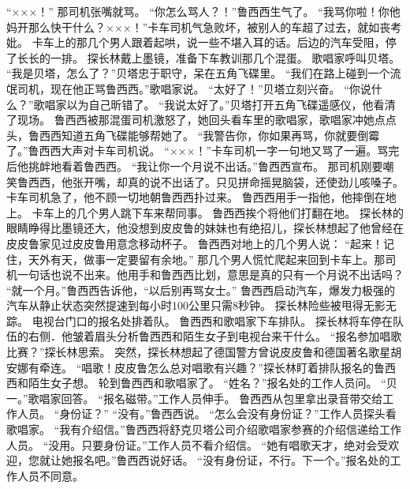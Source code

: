 \documentclass[a4paper,12pt,UTF8,twoside]{ctexbook}
\begin{document}
        “×××！”  
        那司机张嘴就骂。  
        “你怎么骂人？！”鲁西西生气了。  
        “我骂你啦！你他妈开那么快干什么？×××！”卡车司机气急败坏，被别人的车超了过去，就如丧考妣。        
        卡车上的那几个男人跟着起哄，说一些不堪入耳的话。后边的汽车受阻，停了长长的一排。  
        探长林戴上墨镜，准备下车教训那几个混蛋。  
        歌唱家呼叫贝塔。  
        “我是贝塔，怎么了？”贝塔忠于职守，呆在五角飞碟里。  
        “我们在路上碰到一个流氓司机，现在他正骂鲁西西。”歌唱家说。  
        “太好了！”贝塔立刻兴奋。  
        “你说什么？”歌唱家以为自己昕错了。  
        “我说太好了。”贝塔打开五角飞碟遥感仪，他看清了现场。  
        鲁西西被那混蛋司机激怒了，她回头看车里的歌唱家，歌唱家冲她点点头，鲁西西知道五角飞碟能够帮她了。  
        “我警告你，你如果再骂，你就要倒霉了。”鲁西西大声对卡车司机说。  
        “×××！”卡车司机一字一句地又骂了一遍。骂完后他挑衅地看着鲁西西。  
        “我让你一个月说不出话。”鲁西西宣布。  
        那司机刚要嘲笑鲁西西，他张开嘴，却真的说不出话了。只见拼命摇晃脑袋，还使劲儿咳嗓子。  
        卡车司机急了，他不顾一切地朝鲁西西扑过来。  
        鲁西西用手一指他，他摔倒在地上。        
        卡车上的几个男人跳下车来帮同事。  
        鲁西西挨个将他们打翻在地。  
        探长林的眼睛睁得比墨镜还大，他没想到皮皮鲁的妹妹也有绝招儿，探长林想起了他曾经在皮皮鲁家见过皮皮鲁用意念移动杯子。  
        鲁西西对地上的几个男人说：  
        “起来！记住，天外有天，做事一定要留有余地。”  
        那几个男人慌忙爬起来回到卡车上。那司机一句话也说不出来。他用手和鲁西西比划，意思是真的只有一个月说不出话吗？  
        “就一个月。”鲁西西告诉他，“以后别再骂女士。”  
        鲁西西启动汽车，爆发力极强的汽车从静止状态突然提速到每小时100公里只需8秒钟。  
        探长林险些被甩得无影无踪。  
        电视台门口的报名处排着队。  
        鲁西西和歌唱家下车排队。  
        探长林将车停在队伍的右侧．他皱着眉头分析鲁西西和陌生女子到电视台来干什么。  
        “报名参加唱歌比赛？”探长林思索。  
        突然，探长林想起了德国警方曾说皮皮鲁和德国著名歌星胡安娜有牵连。  
        “唱歌！皮皮鲁怎么总对唱歌有兴趣？”探长林盯着排队报名的鲁西西和陌生女子想。  
        轮到鲁西西和歌唱家了。  
        “姓名？”报名处的工作人员问。  
        “贝一。”歌唱家回答。  
        “报名磁带。”工作人员伸手。  
        鲁西西从包里拿出录音带交给工作人员。  
        “身份证？”  
        “没有。”鲁西西说。  
        “怎么会没有身份证？”工作人员探头看歌唱家。  
        “我有介绍信。”鲁西西将舒克贝塔公司介绍歌唱家参赛的介绍信递给工作人员。  
        “没用。只要身份证。”工作人员不看介绍信。  
        “她有唱歌天才，绝对会受欢迎，您就让她报名吧。”鲁西西说好话。  
        “没有身份证，不行。下一个。”报名处的工作人员不同意。  
\end{document}
